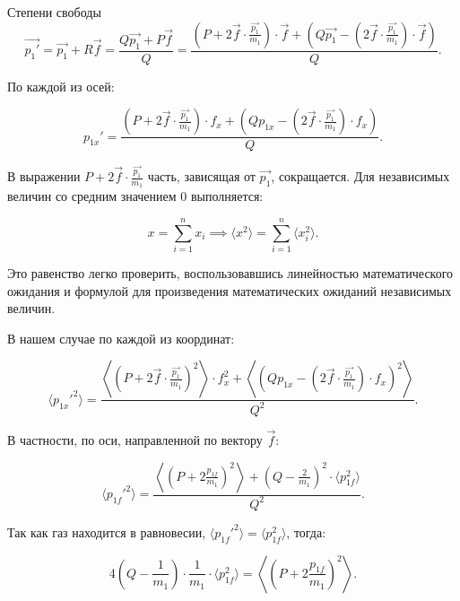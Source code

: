 \documentclass{article}
\begin{document}
\begin{section}{Степени свободы}
		\begin{equation*}
			\vec{p_1'} = \vec{p_1} + R \vec{f} = \frac{Q \vec{p_1} + P \vec{f}}{Q} = \frac{\left( P + 2 \vec{f} \cdot \frac{\vec{p_1}}{m_1} \right) \cdot \vec{f} + \left( Q \vec{p_1} - \left( 2 \vec{f} \cdot \frac{\vec{p_1}}{m_1} \right) \cdot \vec{f} \right)}{Q}.
		\end{equation*}

		По каждой из осей:

		\begin{equation*}
			p_{1x}' = \frac{\left( P + 2 \vec{f} \cdot \frac{\vec{p_1}}{m_1} \right) \cdot f_x + \left( Q p_{1x} - \left( 2 \vec{f} \cdot \frac{\vec{p_1}}{m_1} \right) \cdot f_x \right)}{Q}.
		\end{equation*}

		В выражении $P + 2 \vec{f} \cdot \frac{\vec{p_1}}{m_1}$ часть, зависящая от $\vec{p_1}$, сокращается. Для независимых величин со средним значением $0$ выполняется:

		\begin{equation*}
			x = \sum_{i=1}^n x_i \implies \langle x^2 \rangle = \sum_{i=1}^n \langle x_i^2 \rangle.
		\end{equation*}

		Это равенство легко проверить, воспользовавшись линейностью математического ожидания и формулой для произведения математических ожиданий независимых величин.

		В нашем случае по каждой из координат:

		\begin{equation*}
			\langle p_{1x}'^2 \rangle = \frac{\left\langle \left( P + 2 \vec{f} \cdot \frac{\vec{p_1}}{m_1} \right)^2 \right\rangle \cdot f_x^2 + \left\langle \left( Q p_{1x} - \left( 2 \vec{f} \cdot \frac{\vec{p_1}}{m_1} \right) \cdot f_x \right)^2 \right\rangle}{Q^2}.
		\end{equation*}

		В частности, по оси, направленной по вектору $\vec{f}$:

		\begin{equation*}
			\langle p_{1f}'^2 \rangle = \frac{\left\langle \left( P + 2 \frac{p_{1f}}{m_1} \right)^2 \right\rangle + \left( Q - \frac{2}{m_1} \right)^2 \cdot \langle p_{1f}^2 \rangle}{Q^2}.
		\end{equation*}

		Так как газ находится в равновесии, $\langle p_{1f}'^2 \rangle = \langle p_{1f}^2 \rangle$, тогда:

		\begin{equation*}
			4 \left( Q - \frac{1}{m_1} \right) \cdot \frac{1}{m_1} \cdot \langle p_{1f}^2 \rangle = \left\langle \left( P + 2 \frac{p_{1f}}{m_1} \right)^2 \right\rangle.
		\end{equation*}


\end{section}
\end{document}

